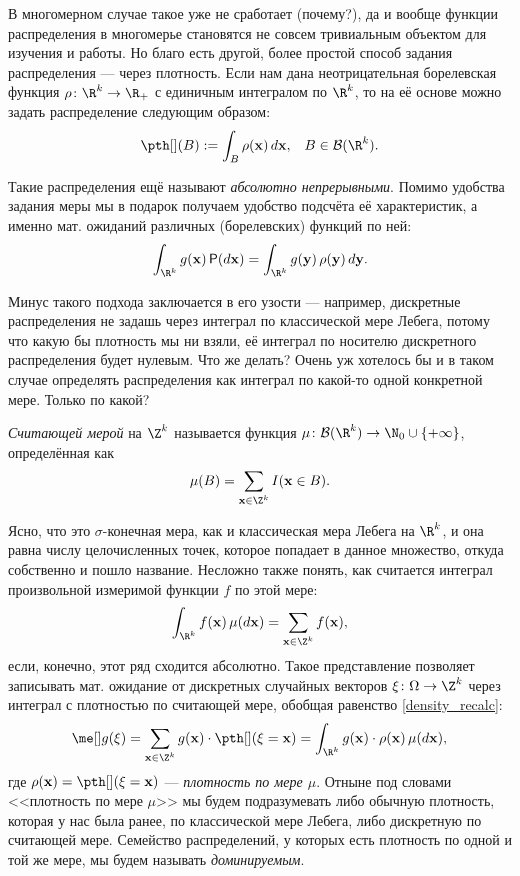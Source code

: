 В многомерном случае такое уже не сработает (почему?), да и вообще функции распределения в многомерье становятся не совсем тривиальным объектом для изучения и работы. Но благо есть другой, более простой способ задания распределения --- через плотность. Если нам дана неотрицательная борелевская функция $\rho\colon \R^k \to \R_+$ с единичным интегралом по $\R^k$, то на её основе можно задать распределение следующим образом:
\[
\pth[](B) := \int_{B} \rho(\mathbf x) \, d\mathbf x, \;\;\; B \in \mathcal B(\R^k).
\]

Такие распределения ещё называют \textit{абсолютно непрерывными}. Помимо удобства задания меры мы в подарок получаем удобство подсчёта её характеристик, а именно мат. ожиданий различных (борелевских) функций по ней:
\begin{equation}\label{density_recalc}
	\int_{\R^k} g(\mathbf x) \, \mathsf{P}(d\mathbf x) = \int_{\R^k} g(\mathbf y) \, \rho(\mathbf y ) \, d\mathbf y.
\end{equation}

Минус такого подхода заключается в его узости --- например, дискретные распределения не задашь через интеграл по классической мере Лебега, потому что какую бы плотность мы ни взяли, её интеграл по носителю дискретного распределения будет нулевым. Что же делать? Очень уж хотелось бы и в таком случае определять распределения как интеграл по какой-то одной конкретной мере. Только по какой?

\begin{definition}
    \textit{Считающей мерой} на $\Z^k$ называется функция $\mu\colon \mathcal{B}(\R^k) \to \N_0 \cup \{+\infty\}$, определённая как
    \[
    \mu(B) = \sum_{\mathbf{x} \in \Z^k} I(\mathbf{x} \in B).
    \]
\end{definition}

Ясно, что это $\sigma$-конечная мера, как и классическая мера Лебега на $\R^k$, и она равна числу целочисленных точек, которое попадает в данное множество, откуда собственно и пошло название. Несложно также понять, как считается интеграл произвольной измеримой функции $f$ по этой мере:
\[
\int_{\R^k} f(\mathbf{x})\,\mu(d\mathbf{x}) = \sum_{\mathbf{x} \in \Z^k} f(\mathbf{x}),
\]
если, конечно, этот ряд сходится абсолютно. Такое представление позволяет записывать мат. ожидание от дискретных случайных векторов $\xi\colon \Omega \to \Z^k$ через интеграл с плотностью по считающей мере, обобщая равенство \eqref{density_recalc}:
\begin{equation}\label{density_recalc_discr}
	\me[] g(\xi) = \sum_{\mathbf{x} \in \Z^k} g(\mathbf{x}) \cdot \pth[](\xi = \mathbf{x}) = \int_{\R^k} g(\mathbf{x}) \cdot \rho(\mathbf{x})\,\mu(d\mathbf{x}),
\end{equation}
где $\rho(\mathbf{x}) = \pth[](\xi = \mathbf{x})$ --- \textit{плотность по мере $\mu$}. Отныне под словами <<плотность по мере $\mu$>> мы будем подразумевать либо обычную плотность, которая у нас была ранее, по классической мере Лебега, либо дискретную по считающей мере. Семейство распределений, у которых есть плотность по одной и той же мере, мы будем называть \textit{доминируемым}.

